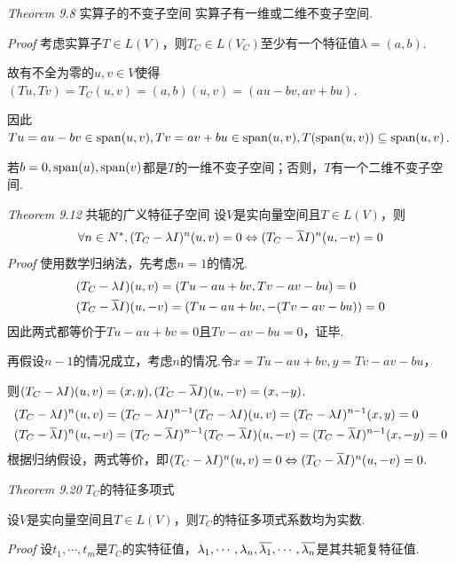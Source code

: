 \textit{Theorem 9.8} {\kaishu 实算子的不变子空间}
实算子有一维或二维不变子空间.

\textit{Proof}
考虑实算子\(T \in L(V)\)，则\(T_C \in L(V_C)\)至少有一个特征值\(\lambda=(a,b)\).

故有不全为零的\(u,v \in V\)使得\((Tu,Tv)=T_C(u,v)=(a,b)(u,v)=(au-bv,av+bu)\).

因此\(Tu=au-bv \in \mathrm{span}(u,v),Tv=av+bu \in \mathrm{span}(u,v),T(\mathrm{span}(u,v)) \subseteq \mathrm{span}(u,v)\).

若\(b=0,\mathrm{span}(u),\mathrm{span}(v)\)都是\(T\)的一维不变子空间；否则，\(T\)有一个二维不变子空间.

\hspace*{\fill}

\textit{Theorem 9.12} {\kaishu 共轭的广义特征子空间}
设\(V\)是实向量空间且\(T \in L(V)\)，则
    \begin{align*}
        \forall n \in N^*,(T_C-\lambda I)^n (u,v)=0 \Leftrightarrow (T_C-\overline{\lambda} I)^n (u,-v)=0
    \end{align*}
\textit{Proof}
使用数学归纳法，先考虑\(n=1\)的情况.
    \begin{align*}
        &(T_C-\lambda I)(u,v)=(Tu-au+bv,Tv-av-bu)=0 \\
        &(T_C-\overline{\lambda} I)(u,-v)=(Tu-au+bv,-(Tv-av-bu))=0
    \end{align*}
因此两式都等价于\(Tu-au+bv=0\)且\(Tv-av-bu=0\)，证毕.

再假设\(n-1\)的情况成立，考虑\(n\)的情况.令\(x=Tu-au+bv,y=Tv-av-bu\)，

则\((T_C-\lambda I)(u,v)=(x,y),(T_C-\overline{\lambda} I)(u,-v)=(x,-y)\).
    \begin{align*}
        &(T_C-\lambda I)^n (u,v)=(T_C-\lambda I)^{n-1}(T_C-\lambda I)(u,v)
        =(T_C-\lambda I)^{n-1}(x,y)=0 \\
        &(T_C-\overline{\lambda} I)^n (u,-v)=(T_C-\overline{\lambda} I)^{n-1}(T_C-\overline{\lambda}I)(u,-v)
        =(T_C-\overline{\lambda} I)^{n-1}(x,-y)=0    
    \end{align*}
根据归纳假设，两式等价，即\((T_C-\lambda I)^n (u,v)=0 \Leftrightarrow (T_C-\overline{\lambda} I)^n (u,-v)=0\).

\hspace*{\fill}

\textit{Theorem 9.20} \(T_C\){\kaishu 的特征多项式}

设\(V\)是实向量空间且\(T \in L(V)\)，则\(T_C\)的特征多项式系数均为实数.

\textit{Proof}
设\(t_1,\cdots,t_m\)是\(T_C\)的实特征值，\(\lambda_1,\cdots,\lambda_n,\overline{\lambda_1},\cdots,\overline{\lambda_n}\)是其共轭复特征值.


